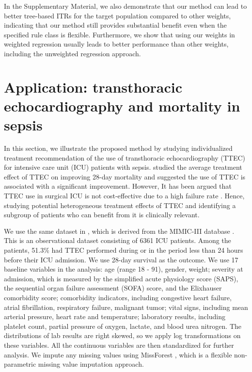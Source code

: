 \documentclass[12pt]{article}
\begin{document}
 {In the Supplementary Material, we also demonstrate that our method can lead to better tree-based ITRs for the target population compared to other weights, indicating that our method still provides substantial benefit even when the specified rule class is flexible. Furthermore, we show that using our weights in weighted regression usually leads to better performance than other weights, including the unweighted regression approach.}



\section{Application: transthoracic echocardiography and mortality in sepsis}
\label{sec:data}

In this section, we illustrate the proposed method by studying individualized treatment recommendation of the use of transthoracic echocardiography (TTEC) for intensive care unit (ICU) patients with sepsis. \citet{feng2018transthoracic} studied the average treatment effect of TTEC on improving 28-day mortality and suggested the use of TTEC is associated with a significant improvement. However, It has been argued that TTEC use in surgical ICU  is not cost-effective due to a high failure rate \citep{cook2002transthoracic}. Hence, studying potential heterogeneous treatment effects of TTEC and identifying a subgroup of patients who can benefit from it is clinically relevant.

We use the same dataset in \citet{feng2018transthoracic}, which is derived from the MIMIC-III database \citep{johnson2016mimic}. This is an observational dataset consisting of 6361 ICU patients. Among the patients, 51.3\% had TTEC performed during or in the period less than 24 hours before their ICU admission. We use 28-day survival as the outcome. We use 17 baseline variables in the analysis: age (range 18 - 91), gender, weight; severity at admission, which is measured by the simplified acute physiology score (SAPS), the sequential organ failure assessment (SOFA) score, and the Elixhauser comorbidity score; comorbidity indicators, including congestive heart failure, atrial fibrillation, respiratory failure, malignant tumor; vital signs, including mean arterial pressure, heart rate and temperature; laboratory results, including platelet count, partial pressure of oxygen, lactate, and blood urea nitrogen.
The distributions of lab results are right skewed, so we apply log transformations on these variables. All the continuous variables are then standardized for further analysis. We impute any missing values using MissForest \citep{stekhoven2012missforest}, which is a flexible non-parametric missing value imputation approach.
\end{document}
